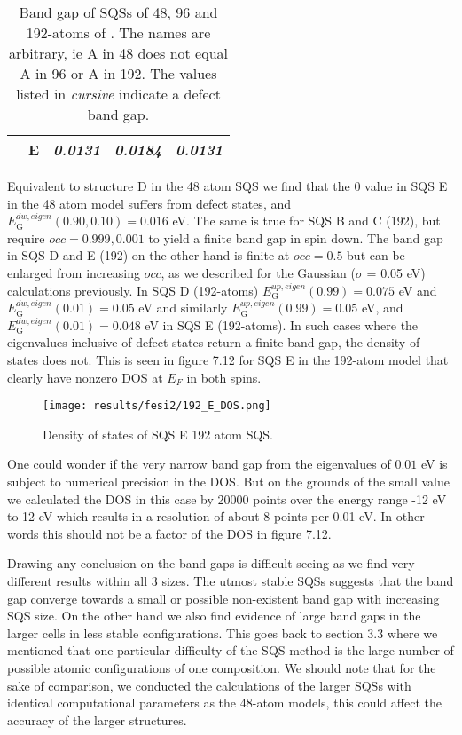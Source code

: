 \begin{table}[H]
\begin{tabular}{@{}ccccc@{}}
\multicolumn{1}{c|}{}                     & \textbf{E} & \textit{0.0131}                                                                & \textit{0.0184}                                                                         & \textit{0.0131}                                                                          \\ \bottomrule 
\end{tabular}
\caption{Band gap of SQSs of 48, 96 and 192-atoms of . The names are arbitrary, ie A in 48 does not equal A in 96 or A in 192. The values listed in \textit{cursive} indicate a defect band gap.}
\end{table}

Equivalent to structure D in the 48 atom SQS we find that the 0 value in SQS E in the 48 atom model suffers from defect states, and $E_\text{G} ^{dw, eigen}(0.90, 0.10) = 0.016$ eV. The same is true for SQS B and C (192), but require $occ = 0.999, 0.001$ to yield a finite band gap in spin down. The band gap in SQS D and E (192) on the other hand is finite at $occ = 0.5$ but can be enlarged from increasing $occ$, as we described for the Gaussian ($\sigma$ = 0.05 eV) calculations previously. In SQS D (192-atoms) $E_\text{G} ^{up, eigen}(0.99) = 0.075$ eV and $E_\text{G} ^{dw, eigen}(0.01) = 0.05$ eV and similarly $E_\text{G} ^{up, eigen}(0.99) = 0.05$ eV, and $E_\text{G} ^{dw, eigen}(0.01) = 0.048$ eV in SQS E (192-atoms). In such cases where the eigenvalues inclusive of defect states return a finite band gap, the density of states does not. This is seen in figure 7.12 for SQS E in the 192-atom model that clearly have nonzero DOS at $E_F$ in both spins. 

\begin{figure}[H]
\centering
\texttt{[image: results/fesi2/192\_E\_DOS.png]}
\caption{Density of states of SQS E 192 atom SQS.}
\end{figure}    
 
One could wonder if the very narrow band gap from the eigenvalues of $0.01$ eV is subject to numerical precision in the DOS. But on the grounds of the small value we calculated the DOS in this case by 20000 points over the energy range -12 eV to 12 eV which results in a resolution of about 8 points per 0.01 eV. In other words this should not be a factor of the DOS in figure 7.12. 
 
Drawing any conclusion on the band gaps is difficult seeing as we find very different results within all 3 sizes. The utmost stable SQSs suggests that the band gap converge towards a small or possible non-existent band gap with increasing SQS size. On the other hand we also find evidence of large band gaps in the larger cells in less stable configurations. This goes back to section 3.3 where we mentioned that one particular difficulty of the SQS method is the large number of possible atomic configurations of one composition. We should note that for the sake of comparison, we conducted the calculations of the larger SQSs with identical computational parameters as the 48-atom models, this could affect the accuracy of the larger structures.      

